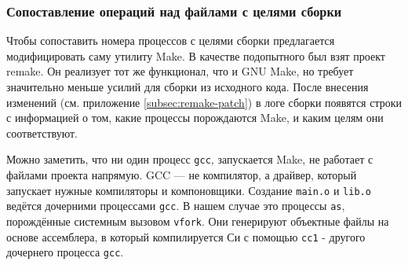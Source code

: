 \subsubsection{Сопоставление операций над файлами с целями сборки}
\label{subsec:link-ops-with-targets}

Чтобы сопоставить номера процессов с целями сборки предлагается модифицировать саму утилиту Make. В качестве подопытного был взят проект remake. Он реализует тот же функционал, что и GNU Make, но требует значительно меньше усилий для сборки из исходного кода. После внесения изменений (см. приложение \ref{subsec:remake-patch}) в логе сборки появятся строки с информацией о том, какие процессы порождаются Make, и каким целям они соответствуют.



Можно заметить, что ни один процесс \texttt{gcc}, запускается Make, не работает с файлами проекта напрямую. GCC --- не компилятор, а драйвер, который запускает нужные компиляторы и компоновщики. Создание \texttt{main.o} и \texttt{lib.o} ведётся дочерними процессами \texttt{gcc}. В нашем случае это процессы \texttt{as}, порождённые системным вызовом \texttt{vfork}. Они генерируют объектные файлы на основе ассемблера, в который компилируется Си с помощью \texttt{cc1} - другого дочернего процесса \texttt{gcc}.

